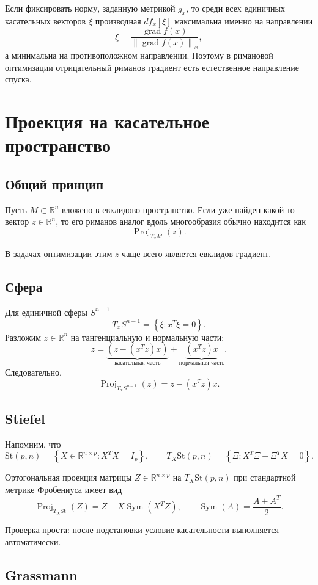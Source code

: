 \documentclass[12pt,a4paper]{article}
\theoremstyle{rudef}
\theoremstyle{ruplain}
\newcommand{\R}{\mathbb{R}}
\newcommand{\grad}{\operatorname{grad}}
\newcommand{\Sym}{\operatorname{Sym}}
\newcommand{\Proj}{\operatorname{Proj}}
\newcommand{\St}{\mathrm{St}}
\newcommand{\norm}[1]{\left\lVert #1\right\rVert}
\newcommand{\set}[1]{\left\{#1\right\}}
\newcommand{\parent}[1]{\left(#1\right)}
\begin{document}
Если фиксировать норму, заданную метрикой $g_x$, то среди всех единичных касательных векторов $\xi$ производная $df_x[\xi]$ максимальна именно на направлении
\[
\xi = \frac{\grad f(x)}{\norm{\grad f(x)}_x},
\]
а минимальна на противоположном направлении. Поэтому в римановой оптимизации отрицательный риманов градиент есть естественное направление спуска.

\section{Проекция на касательное пространство}

\subsection{Общий принцип}

Пусть $M\subset \R^n$ вложено в евклидово пространство. Если уже найден какой-то вектор $z\in \R^n$, то его риманов аналог вдоль многообразия обычно находится как
\[
\Proj_{T_xM}(z).
\]

В задачах оптимизации этим $z$ чаще всего является евклидов градиент.

\subsection{Сфера}

Для единичной сферы $S^{n-1}$
\[
T_xS^{n-1}=\set{\xi: x^T\xi=0}.
\]
Разложим $z\in \R^n$ на тангенциальную и нормальную части:
\[
z = \underbrace{\parent{z-(x^Tz)x}}_{\text{касательная часть}} + \underbrace{(x^Tz)x}_{\text{нормальная часть}}.
\]
Следовательно,
\[
\boxed{\ \Proj_{T_xS^{n-1}}(z)=z-(x^Tz)x.\ }
\]

\subsection{Stiefel}

Напомним, что
\[
\St(p,n)=\set{X\in \R^{n\times p}: X^TX=I_p},
\qquad
T_X\St(p,n)=\set{\Xi: X^T\Xi+\Xi^TX=0}.
\]

Ортогональная проекция матрицы $Z\in \R^{n\times p}$ на $T_X\St(p,n)$ при стандартной метрике Фробениуса имеет вид
\[
\boxed{\ \Proj_{T_X\St}(Z)= Z - X\Sym(X^TZ),\qquad \Sym(A)=\frac{A+A^T}{2}.\ }
\]

Проверка проста: после подстановки условие касательности выполняется автоматически.

\subsection{Grassmann}
\end{document}
